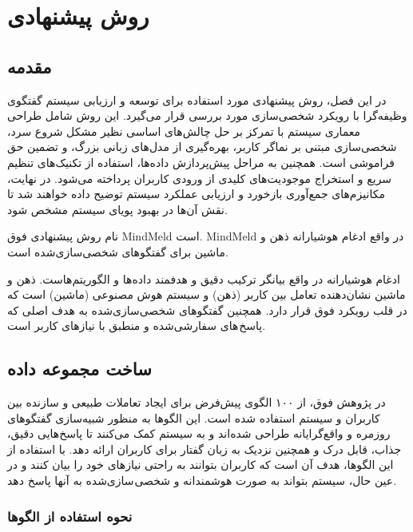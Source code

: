\chapter{روش پیشنهادی}
\section{مقدمه} 
در این فصل، روش پیشنهادی مورد استفاده برای توسعه و ارزیابی سیستم گفتگوی وظیفه‌گرا با رویکرد شخصی‌سازی مورد بررسی قرار می‌گیرد. این روش شامل طراحی معماری سیستم با تمرکز بر حل چالش‌های اساسی نظیر مشکل شروع سرد، شخصی‌سازی مبتنی بر نماگر کاربر، بهره‌گیری از مدل‌های زبانی بزرگ، و تضمین حق فراموشی است. 
همچنین به مراحل پیش‌پردازش داده‌ها، استفاده از تکنیک‌های تنظیم سریع و استخراج موجودیت‌های کلیدی از ورودی کاربران پرداخته می‌شود. در نهایت، مکانیزم‌های جمع‌آوری بازخورد و ارزیابی عملکرد سیستم توضیح داده خواهند شد تا نقش آن‌ها در بهبود پویای سیستم مشخص شود.

نام روش پیشنهادی فوق MindMeld است. MindMeld در واقع ادغام هوشیارانه ذهن و ماشین برای گفتگوهای شخصی‌سازی‌شده است.


ادغام هوشیارانه در واقع بیانگر ترکیب دقیق و هدفمند داده‌ها و الگوریتم‌هاست. ذهن و ماشین نشان‌دهنده تعامل بین کاربر (ذهن) و سیستم هوش مصنوعی (ماشین) است که در قلب رویکرد فوق قرار دارد. همچنین گفتگوهای شخصی‌سازی‌شده به هدف اصلی که پاسخ های سفارشی‌شده و منطبق با نیازهای کاربر است.
\section{ساخت مجموعه داده}
در پژوهش فوق، از ۱۰۰ الگوی پیش‌فرض برای ایجاد تعاملات طبیعی و سازنده بین کاربران و سیستم استفاده شده است. این الگوها به منظور شبیه‌سازی گفتگوهای روزمره و واقع‌گرایانه طراحی شده‌اند و به سیستم کمک می‌کنند تا پاسخ‌هایی دقیق، جذاب، قابل درک و همچنین نزدیک به زبان گفتار برای کاربران ارائه دهد. با استفاده از این الگوها، هدف آن است که کاربران بتوانند به راحتی نیازهای خود را بیان کنند و در عین حال، سیستم بتواند به صورت هوشمندانه و شخصی سازی‌شده به آنها پاسخ دهد.

\subsection{نحوه استفاده از الگوها}

